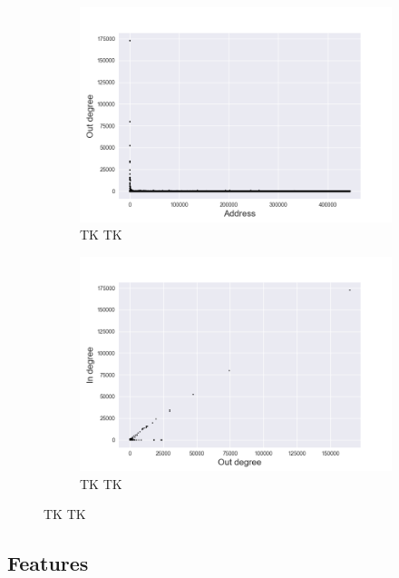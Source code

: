 \documentclass{article} %
\begin{document}
\begin{figure}
\centering
\begin{subfigure}{.5\textwidth}
    \centering
    \includegraphics[width=1\linewidth]{figures/degree_address}
    \caption{\small TK TK}
    \label{fig:degree_address}
\end{subfigure}%
\begin{subfigure}{.5\textwidth}
    \centering
    \includegraphics[width=1\linewidth]{figures/in_out_degree}
    \caption{\small TK TK}
    \label{fig:in_out_degree}
\end{subfigure}
\caption{\small TK TK}
\label{fig:test}
\end{figure}

\subsection{Features}\label{features}
\end{document}
